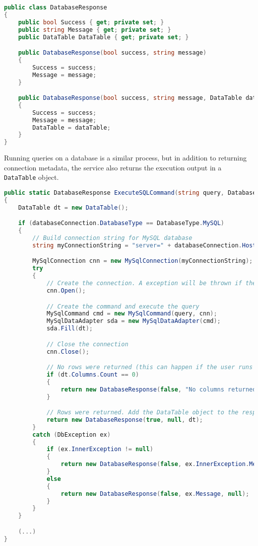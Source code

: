\begin{lstlisting}[language=csharp, caption={The DatabaseResponse class}]
public class DatabaseResponse
{
    public bool Success { get; private set; }
    public string Message { get; private set; }
    public DataTable DataTable { get; private set; }

    public DatabaseResponse(bool success, string message)
    {
        Success = success;
        Message = message;
    }

    public DatabaseResponse(bool success, string message, DataTable dataTable)
    {
        Success = success;
        Message = message;
        DataTable = dataTable;
    }
}
\end{lstlisting}

Running queries on a database is a similar process, but in addition to returning connection metadata, the service also returns the execution output in a \texttt{DataTable} object.

\begin{lstlisting}[language=csharp, caption={The ExecuteSQLCommand() that sends a query to a database}]
public static DatabaseResponse ExecuteSQLCommand(string query, DatabaseConnection databaseConnection)
{
    DataTable dt = new DataTable();

    if (databaseConnection.DatabaseType == DatabaseType.MySQL)
    {
        // Build connection string for MySQL database
        string myConnectionString = "server=" + databaseConnection.Hostname + ";port=" + databaseConnection.Port + ";database=" + databaseConnection.DatabaseName + ";uid=" + databaseConnection.Username + ";pwd=" + databaseConnection.Password + ";";

        MySqlConnection cnn = new MySqlConnection(myConnectionString);
        try
        {
            // Create the connection. A exception will be thrown if the connection cannot be established successfully 
            cnn.Open();

            // Create the command and execute the query
            MySqlCommand cmd = new MySqlCommand(query, cnn);
            MySqlDataAdapter sda = new MySqlDataAdapter(cmd);
            sda.Fill(dt);

            // Close the connection
            cnn.Close();

            // No rows were returned (this can happen if the user runs a query different from "SELECT")
            if (dt.Columns.Count == 0)
            {
                return new DatabaseResponse(false, "No columns returned.", null);
            }

            // Rows were returned. Add the DataTable object to the response
            return new DatabaseResponse(true, null, dt);
        }
        catch (DbException ex)
        {
            if (ex.InnerException != null)
            {
                return new DatabaseResponse(false, ex.InnerException.Message, null);
            }
            else
            {
                return new DatabaseResponse(false, ex.Message, null);
            }
        }
    }

    (...)
}
\end{lstlisting}

